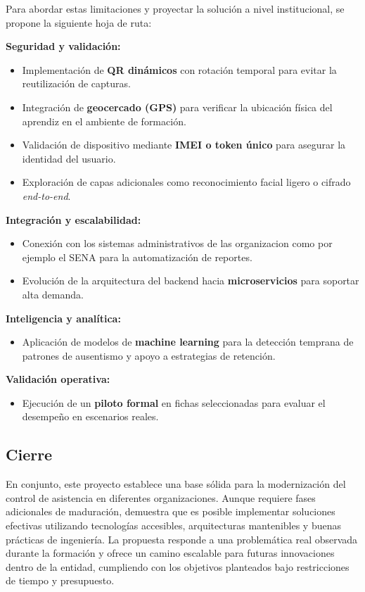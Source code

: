 Para abordar estas limitaciones y proyectar la solución a nivel institucional, se propone la siguiente hoja de ruta:

\textbf{Seguridad y validación:} \begin{itemize} \item Implementación de \textbf{QR dinámicos} con rotación temporal para evitar la reutilización de capturas. \item Integración de \textbf{geocercado (GPS)} para verificar la ubicación física del aprendiz en el ambiente de formación. \item Validación de dispositivo mediante \textbf{IMEI o token único} para asegurar la identidad del usuario. \item Exploración de capas adicionales como reconocimiento facial ligero o cifrado \textit{end-to-end}. \end{itemize}

\textbf{Integración y escalabilidad:} \begin{itemize} \item Conexión con los sistemas administrativos de las organizacion como por ejemplo el SENA para la automatización de reportes. \item Evolución de la arquitectura del backend hacia \textbf{microservicios} para soportar alta demanda. \end{itemize}

\textbf{Inteligencia y analítica:} \begin{itemize} \item Aplicación de modelos de \textbf{machine learning} para la detección temprana de patrones de ausentismo y apoyo a estrategias de retención. \end{itemize}

\textbf{Validación operativa:} \begin{itemize} \item Ejecución de un \textbf{piloto formal} en fichas seleccionadas para evaluar el desempeño en escenarios reales. \end{itemize}

\subsection{Cierre}

En conjunto, este proyecto establece una base sólida para la modernización del control de asistencia en diferentes organizaciones. Aunque requiere fases adicionales de maduración, demuestra que es posible implementar soluciones efectivas utilizando tecnologías accesibles, arquitecturas mantenibles y buenas prácticas de ingeniería. La propuesta responde a una problemática real observada durante la formación y ofrece un camino escalable para futuras innovaciones dentro de la entidad, cumpliendo con los objetivos planteados bajo restricciones de tiempo y presupuesto.